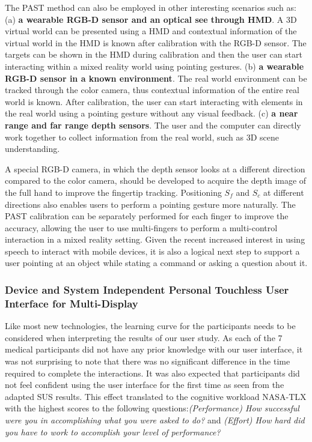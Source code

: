 The PAST method can also be employed in other interesting scenarios such as: (a) \textbf{a wearable RGB-D sensor and an optical see through HMD}. A 3D virtual world can be presented using a HMD and contextual information of the virtual world in the HMD is known after calibration with the RGB-D sensor. The targets can be shown in the HMD during calibration and then the user can start interacting within a mixed reality world using pointing gestures. 
(b) \textbf{a wearable RGB-D sensor in a known environment}. The real world environment can be tracked through the color camera, thus contextual information of the entire real world is known. After calibration, the user can start interacting with elements in the real world using a pointing gesture without any visual feedback.
(c) \textbf{a near range and far range depth sensors}. The user and the computer can directly work together to collect information from the real world, such as 3D scene understanding.

A special RGB-D camera, in which the depth sensor looks at a different direction compared to the color camera, should be developed to acquire the depth image of the full hand to improve the fingertip tracking. 
Positioning $S_f$ and $S_c$ at different directions also enables users to perform a pointing gesture more naturally. 
The PAST calibration can be separately performed for each finger to improve the accuracy, allowing the user to use multi-fingers to perform a multi-control interaction in a mixed reality setting. Given the recent increased interest in using speech to interact with mobile devices, it is also a logical next step to support a user pointing at an object while stating a command or asking a question about it.

\subsubsection{Device and System Independent Personal Touchless User Interface for Multi-Display}
Like most new technologies, the learning curve for the participants needs to be considered when interpreting the results of our user study. As each of the 7 medical participants did not have any prior knowledge with our user interface, it was not surprising to note that there was no significant difference in the time required to complete the interactions.  It was also expected that participants did not feel confident using the user interface for the first time as seen from the adapted SUS results. This effect translated to the cognitive workload NASA-TLX with the highest scores to the following questions:\textit{(Performance) How successful were you in accomplishing what you were asked to do?} and \textit{(Effort) How hard did you have to work to accomplish your level of performance?}

